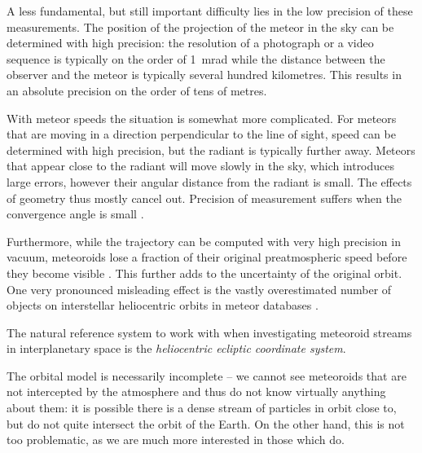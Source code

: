     A less fundamental, but still important difficulty lies in the low precision of these measurements.
    The position of the projection of the meteor in the sky can be determined with high precision:
    the resolution of a photograph or a video sequence is typically on the order of \SI{1}{\milli\radian}
    while the distance between the observer and the meteor is typically several hundred kilometres.
    This results in an absolute precision on the order of tens of metres.

    With meteor speeds the situation is somewhat more complicated.
    For meteors that are moving in a direction perpendicular to the line of sight, speed can be determined
    with high precision, but the radiant is typically further away.
    Meteors that appear close to the radiant will move slowly in the sky, which introduces large errors,
    however their angular distance from the radiant is small. The effects of geometry thus mostly cancel out.
    Precision of measurement suffers when the convergence angle is small \citep{ceplecha1987}.

    Furthermore, while the trajectory can be computed with very high precision in vacuum,
    meteoroids lose a fraction of their original preatmospheric speed before they become visible \citep{vida+2018}.
    This further adds to the uncertainty of the original orbit.
    One very pronounced misleading effect is the vastly overestimated number of objects
    on interstellar heliocentric orbits in meteor databases \citep{hajdukovajr1994}.

    The natural reference system to work with when investigating meteoroid streams in interplanetary space
    is the \emph{heliocentric ecliptic coordinate system}.

    The orbital model is necessarily incomplete -- we cannot see meteoroids that are not intercepted by the atmosphere
    and thus do not know virtually anything about them: it is possible there is a dense stream of
    particles in orbit close to, but do not quite intersect the orbit of the Earth.
    On the other hand, this is not too problematic, as we are much more interested in those which do.

